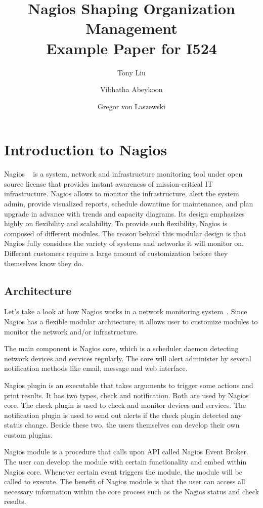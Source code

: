 \documentclass[9pt,twocolumn,twoside]{styles/osajnl}
\title{\centering%
Nagios Shaping Organization Management \\
\large Example Paper for I524}
\author[1]{Tony Liu}
\author[1]{Vibhatha Abeykoon}
\author[1]{Gregor von Laszewski}
\affil[1]{School of Informatics and Computing, Bloomington, IN 47408, U.S.A.}
\begin{document}
\maketitle

\section{Introduction to Nagios}

Nagios ~\cite{www-nagios, wiki-nagios} is a system, network and infrastructure monitoring tool under open source license that provides instant awareness of mission-critical IT infrastructure. Nagios allows to monitor the infrastructure, alert the system admin, provide visualized reports, schedule downtime for maintenance, and plan upgrade in advance with trends and capacity diagrams. Its design emphasizes highly on flexibility and scalability. To provide such flexibility, Nagios is composed of different modules. The reason behind this modular design is that Nagios fully considers the variety of systems and networks it will monitor on. Different customers require a large amount of customization before they themselves know they do.

\subsection{Architecture}

Let's take a look at how Nagios works in a network monitoring system~\cite{nagios-paper-2012}. Since Nagios has a flexible modular architecture, it allows user to customize modules to monitor the network and/or infrastructure. 

The main component is Nagios core, which is a scheduler daemon detecting network devices and services regularly. The core will alert administer by several notification methods like email, message and web interface. 

Nagios plugin is an executable that takes arguments to trigger some actions and print results. It has two types, check and notification. Both are used by Nagios core. The check plugin is used to check and monitor devices and services. The notification plugin is used to send out alerts if the check plugin detected any status change. Beside these two, the users themselves can develop their own custom plugins. 

Nagios module is a procedure that calls upon API called Nagios Event Broker. The user can develop the module with certain functionality and embed within Nagios core. Whenever certain event triggers the module, the module will be called to execute. The benefit of Nagios module is that the user can access all necessary information within the core process such as the Nagios status and check results. 
\end{document}
